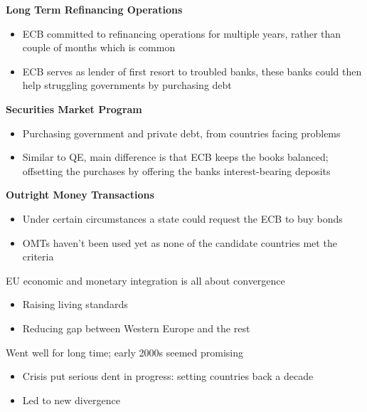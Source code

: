 \documentclass{beamer}
\begin{document}
\begin{frame}
  \textbf{Long Term Refinancing Operations}
  \begin{itemize}
    \item ECB committed to refinancing operations for multiple years, rather than couple of months which is common    
    \item ECB serves as lender of first resort to troubled banks, these banks could then help struggling governments by purchasing debt    
  \end{itemize}
  \medskip
  \textbf{Securities Market Program}
  \begin{itemize}
    \item Purchasing government and private debt, from countries facing problems
    \item Similar to QE, main difference is that ECB keeps the books balanced; offsetting the purchases by offering the banks interest-bearing deposits
  \end{itemize}
  \medskip
  \textbf{Outright Money Transactions}
  \begin{itemize}
    \item Under certain circumstances a state could request the ECB to buy bonds     
    \item OMTs haven't been used yet as none of the candidate countries met the criteria
  \end{itemize}
\end{frame}

\begin{frame} 
  EU economic and monetary integration is all about convergence
  \begin{itemize}
    \item Raising living standards
    \item Reducing gap between Western Europe and the rest
  \end{itemize}
  \medskip
  Went well for long time; early 2000s seemed promising
  \begin{itemize}
    \item Crisis put serious dent in progress: setting countries back a decade
    \item Led to new divergence
  \end{itemize}
\end{frame}
\end{document}
